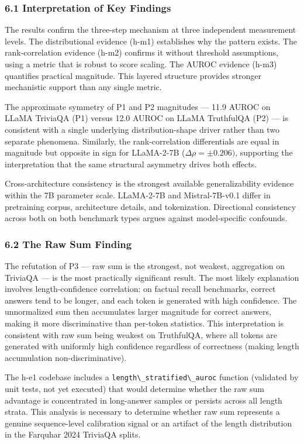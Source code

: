 
\subsubsection{6.1 Interpretation of Key Findings}

The results confirm the three-step mechanism at three independent measurement levels. The distributional evidence (h-m1) establishes why the pattern exists. The rank-correlation evidence (h-m2) confirms it without threshold assumptions, using a metric that is robust to score scaling. The AUROC evidence (h-m3) quantifies practical magnitude. This layered structure provides stronger mechanistic support than any single metric.

The approximate symmetry of P1 and P2 magnitudes --- 11.9 AUROC on LLaMA TriviaQA (P1) versus 12.0 AUROC on LLaMA TruthfulQA (P2) --- is consistent with a single underlying distribution-shape driver rather than two separate phenomena. Similarly, the rank-correlation differentials are equal in magnitude but opposite in sign for LLaMA-2-7B ($\Delta\rho = \pm 0.206)$, supporting the interpretation that the same structural asymmetry drives both effects.

Cross-architecture consistency is the strongest available generalizability evidence within the 7B parameter scale. LLaMA-2-7B and Mistral-7B-v0.1 differ in pretraining corpus, architecture details, and tokenization. Directional consistency across both on both benchmark types argues against model-specific confounds.

\subsubsection{6.2 The Raw Sum Finding}

The refutation of P3 --- raw sum is the strongest, not weakest, aggregation on TriviaQA --- is the most practically significant result. The most likely explanation involves length-confidence correlation: on factual recall benchmarks, correct answers tend to be longer, and each token is generated with high confidence. The unnormalized sum then accumulates larger magnitude for correct answers, making it more discriminative than per-token statistics. This interpretation is consistent with raw sum being weakest on TruthfulQA, where all tokens are generated with uniformly high confidence regardless of correctness (making length accumulation non-discriminative).

The h-e1 codebase includes a \texttt{length\textbackslash \_stratified\textbackslash \_auroc} function (validated by unit tests, not yet executed) that would determine whether the raw sum advantage is concentrated in long-answer samples or persists across all length strata. This analysis is necessary to determine whether raw sum represents a genuine sequence-level calibration signal or an artifact of the length distribution in the Farquhar 2024 TriviaQA splits.


